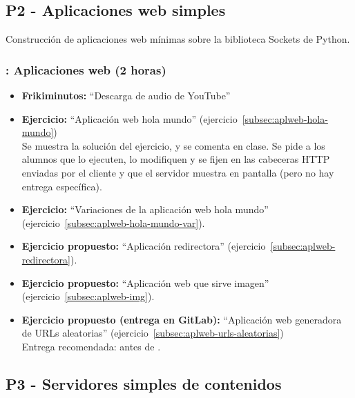 \documentclass[a4paper,12pt]{article}
\begin{document}
\subsection{P2 - Aplicaciones web simples}


Construcción de aplicaciones web mínimas sobre la biblioteca Sockets de Python.


\subsubsection{\juevesD: Aplicaciones web (2 horas)}
\label{cal:juevesD}

\begin{itemize}
\item \textbf{Frikiminutos:} ``Descarga de audio de YouTube''
\item \textbf{Ejercicio:} ``Aplicación web hola mundo'' (ejercicio~\ref{subsec:aplweb-hola-mundo}) \\
   Se muestra la solución del ejercicio, y se comenta en clase. Se pide a los alumnos que lo ejecuten, lo modifiquen y se fijen en las cabeceras HTTP enviadas por el cliente y que el servidor muestra en pantalla (pero no hay entrega específica).
 \item \textbf{Ejercicio:} ``Variaciones de la aplicación web hola mundo'' (ejercicio~\ref{subsec:aplweb-hola-mundo-var}).
 \item \textbf{Ejercicio propuesto:} ``Aplicación redirectora'' (ejercicio~\ref{subsec:aplweb-redirectora}).
 \item \textbf{Ejercicio propuesto:} ``Aplicación web que sirve imagen'' (ejercicio~\ref{subsec:aplweb-img}).

\item \textbf{Ejercicio propuesto (entrega en GitLab):} ``Aplicación web generadora de URLs aleatorias'' (ejercicio~\ref{subsec:aplweb-urls-aleatorias}) \\
   Entrega recomendada: antes de \juevesE.
\end{itemize}


\subsection{P3 - Servidores simples de contenidos}
\end{document}
